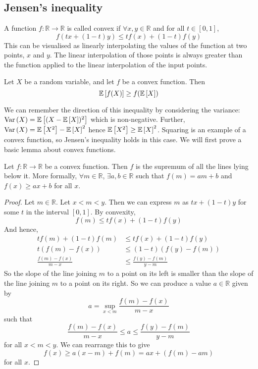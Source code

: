 \subsection{Jensen's inequality}
\begin{definition}
	A function \(f\colon \mathbb R \to \mathbb R\) is called convex if \(\forall x, y \in \mathbb R\) and for all \(t \in [0, 1]\),
	\[
		f(tx + (1-t)y) \leq tf(x) + (1-t)f(y)
	\]
	This can be visualised as linearly interpolating the values of the function at two points, \(x\) and \(y\).
	The linear interpolation of those points is always greater than the function applied to the linear interpolation of the input points.
\end{definition}
\begin{theorem}
	Let \(X\) be a random variable, and let \(f\) be a convex function.
	Then
	\[
		\mathbb{E}\left[{f(X)}\right] \geq f(\mathbb{E}\left[{X}\right])
	\]
\end{theorem}
We can remember the direction of this inequality by considering the variance: \(\operatorname{Var}\left({X}\right) = \mathbb{E}\left[{(X - \mathbb{E}\left[{X}\right])^2}\right]\) which is non-negative.
Further, \(\operatorname{Var}\left({X}\right) = \mathbb{E}\left[{X^2}\right] - \mathbb{E}\left[{X}\right]^2\) hence \(\mathbb{E}\left[{X^2}\right] \geq \mathbb{E}\left[{X}\right]^2\).
Squaring is an example of a convex function, so Jensen's inequality holds in this case.
We will first prove a basic lemma about convex functions.
\begin{lemma}
	Let \(f \colon \mathbb R \to \mathbb R\) be a convex function.
	Then \(f\) is the supremum of all the lines lying below it.
	More formally, \(\forall m \in \mathbb R\), \(\exists a, b \in \mathbb R\) such that \(f(m) = am + b\) and \(f(x) \geq ax + b\) for all \(x\).
\end{lemma}
\begin{proof}
	Let \(m \in \mathbb R\).
	Let \(x < m < y\).
	Then we can express \(m\) as \(tx + (1-t)y\) for some \(t\) in the interval \([0, 1]\).
	By convexity,
	\[
		f(m) \leq tf(x) + (1-t)f(y)
	\]
	And hence,
	\begin{align*}
		tf(m) + (1-t)f(m)         & \leq tf(x) + (1-t)f(y)       \\
		t(f(m) - f(x))            & \leq (1-t)(f(y) - f(m))      \\
		\frac{f(m) - f(x)}{m - x} & \leq \frac{f(y) - f(m)}{y-m}
	\end{align*}
	So the slope of the line joining \(m\) to a point on its left is smaller than the slope of the line joining \(m\) to a point on its right.
	So we can produce a value \(a \in \mathbb R\) given by
	\[
		a = \sup_{x < m} \frac{f(m) - f(x)}{m - x}
	\]
	such that
	\[
		\frac{f(m) - f(x)}{m - x} \leq a \leq \frac{f(y) - f(m)}{y - m}
	\]
	for all \(x < m < y\).
	We can rearrange this to give
	\[
		f(x) \geq a(x-m) + f(m) = ax + (f(m) - am)
	\]
	for all \(x\).
\end{proof}
